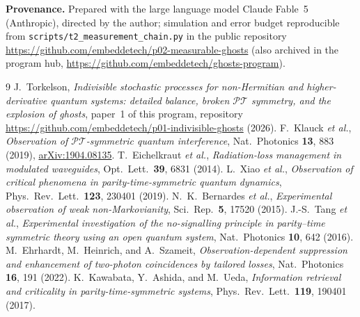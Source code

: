 \documentclass[11pt]{article}
\newcommand{\PT}{\mathcal{PT}}
\begin{document}
\medskip
\noindent\textbf{Provenance.} Prepared with the large language model
Claude Fable~5 (Anthropic), directed by the author; simulation and
error budget reproducible from
\texttt{scripts/t2\_measurement\_chain.py} in the public repository
\url{https://github.com/embeddetech/p02-measurable-ghosts}
(also archived in the program hub,
\url{https://github.com/embeddetech/ghosts-program}).

\begin{thebibliography}{9}\small
{}
J.~Torkelson,
\emph{Indivisible stochastic processes for non-Hermitian and
higher-derivative quantum systems: detailed balance, broken $\PT$
symmetry, and the explosion of ghosts},
paper~1 of this program, repository
\url{https://github.com/embeddetech/p01-indivisible-ghosts}
(2026).
 F.~Klauck \emph{et al.},
\emph{Observation of $\PT$-symmetric quantum interference},
Nat.\ Photonics \textbf{13}, 883 (2019),
\href{https://arxiv.org/abs/1904.08135}{arXiv:1904.08135}.
 T.~Eichelkraut \emph{et al.},
\emph{Radiation-loss management in modulated waveguides},
Opt.\ Lett.\ \textbf{39}, 6831 (2014).
 L.~Xiao \emph{et al.},
\emph{Observation of critical phenomena in parity-time-symmetric
quantum dynamics}, Phys.\ Rev.\ Lett.\ \textbf{123}, 230401 (2019).
 N.~K.~Bernardes \emph{et al.},
\emph{Experimental observation of weak non-Markovianity},
Sci.\ Rep.\ \textbf{5}, 17520 (2015).
 J.-S.~Tang \emph{et al.},
\emph{Experimental investigation of the no-signalling principle in
parity--time symmetric theory using an open quantum system},
Nat.\ Photonics \textbf{10}, 642 (2016).
 M.~Ehrhardt, M.~Heinrich, and A.~Szameit,
\emph{Observation-dependent suppression and enhancement of two-photon
coincidences by tailored losses},
Nat.\ Photonics \textbf{16}, 191 (2022).
 K.~Kawabata, Y.~Ashida, and M.~Ueda,
\emph{Information retrieval and criticality in parity-time-symmetric
systems}, Phys.\ Rev.\ Lett.\ \textbf{119}, 190401 (2017).
\end{thebibliography}
\end{document}
